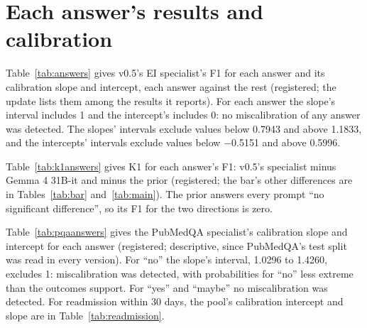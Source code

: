 \documentclass[11pt,letterpaper]{article}
\begin{document}
\section{Each answer's results and calibration}
\label{app:answers}

Table~\ref{tab:answers} gives v0.5's EI specialist's F1 for each answer and its calibration slope and intercept, each answer against the rest (registered; the update lists them among the results it reports). For each answer the slope's interval includes 1 and the intercept's includes 0: no miscalibration of any answer was detected. The slopes' intervals exclude values below 0.7943 and above 1.1833, and the intercepts' intervals exclude values below $-$0.5151 and above 0.5996.

\begin{table}[H]
\centering\footnotesize
\caption{v0.5's Evidence Inference 2.0 specialist on the test split, each answer against the rest: F1, and the calibration slope (the coefficient of a logistic regression of the answer's indicator on the logit of its calibrated probability; 1 is ideal) and intercept (with that logit as an offset; 0 is ideal), each with its 95 percent interval from 1,000 article resamples.}
\label{tab:answers}

\end{table}

Table~\ref{tab:k1answers} gives K1 for each answer's F1: v0.5's specialist minus Gemma 4 31B-it and minus the prior (registered; the bar's other differences are in Tables~\ref{tab:bar} and~\ref{tab:main}). The prior answers every prompt ``no significant difference'', so its F1 for the two directions is zero.

\begin{table}[H]
\centering\footnotesize
\caption{K1 for each answer (registered): the F1 of v0.5's Evidence Inference 2.0 specialist on the 1,218 test prompts, and its difference from Gemma 4 31B-it's and from the prior's, each with its 95 percent interval from 1,000 article resamples. \textsuperscript{\dag}No difference was detected: the interval includes zero.}
\label{tab:k1answers}

\end{table}

Table~\ref{tab:pqaanswers} gives the PubMedQA specialist's calibration slope and intercept for each answer (registered; descriptive, since PubMedQA's test split was read in every version). For ``no'' the slope's interval, 1.0296 to 1.4260, excludes 1: miscalibration was detected, with probabilities for ``no'' less extreme than the outcomes support. For ``yes'' and ``maybe'' no miscalibration was detected. For readmission within 30 days, the pool's calibration intercept and slope are in Table~\ref{tab:readmission}.
\end{document}
